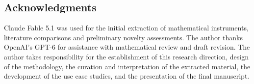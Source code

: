\documentclass[11pt]{article}
\begin{document}
\begin{samepage}
\section*{Acknowledgments}
Claude Fable 5.1 was used for the initial extraction of mathematical instruments, literature comparisons and preliminary novelty assessments. The author thanks OpenAI\textquoteright{}s GPT-6 for assistance with mathematical review and draft revision. The author takes responsibility for the establishment of this research direction, design of the methodology, the curation and interpretation of the extracted material, the development of the use case studies, and the presentation of the final manuscript.
\par\end{samepage}
\end{document}
